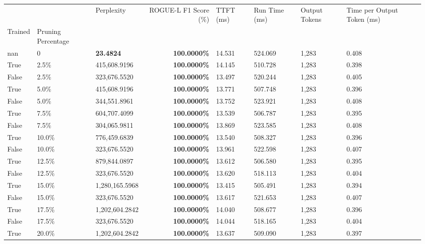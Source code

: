 \begin{table}[H]
\begin{tabular}{lllrllll}
\toprule
 &  & Perplexity & ROGUE-L F1 Score (\%) & TTFT (ms) & Run Time (ms) & Output Tokens & Time per Output Token (ms) \\
Trained & Pruning Percentage &  &  &  &  &  &  \\
\midrule
nan & 0 & \bfseries 23.4824 & \bfseries 100.0000\% & 14.531 & 524.069 & 1,283 & 0.408 \\
\cline{1-8}
True & 2.5\% & 415,608.9196 & \bfseries \color{red} 100.0000\% & 14.145 & 510.728 & 1,283 & 0.398 \\
\cline{1-8}
False & 2.5\% & 323,676.5520 & \bfseries \color{red} 100.0000\% & 13.497 & 520.244 & 1,283 & 0.405 \\
\cline{1-8}
True & 5.0\% & 415,608.9196 & \bfseries \color{red} 100.0000\% & 13.771 & 507.748 & 1,283 & 0.396 \\
\cline{1-8}
False & 5.0\% & 344,551.8961 & \bfseries \color{red} 100.0000\% & 13.752 & 523.921 & 1,283 & 0.408 \\
\cline{1-8}
True & 7.5\% & 604,707.4099 & \bfseries \color{red} 100.0000\% & 13.539 & 506.787 & 1,283 & 0.395 \\
\cline{1-8}
False & 7.5\% & \color{red} 304,065.9811 & \bfseries \color{red} 100.0000\% & 13.869 & 523.585 & 1,283 & 0.408 \\
\cline{1-8}
True & 10.0\% & 776,459.6839 & \bfseries \color{red} 100.0000\% & 13.540 & 508.327 & 1,283 & 0.396 \\
\cline{1-8}
False & 10.0\% & 323,676.5520 & \bfseries \color{red} 100.0000\% & 13.961 & 522.598 & 1,283 & 0.407 \\
\cline{1-8}
True & 12.5\% & 879,844.0897 & \bfseries \color{red} 100.0000\% & 13.612 & 506.580 & 1,283 & 0.395 \\
\cline{1-8}
False & 12.5\% & 323,676.5520 & \bfseries \color{red} 100.0000\% & 13.620 & 518.113 & 1,283 & 0.404 \\
\cline{1-8}
True & 15.0\% & 1,280,165.5968 & \bfseries \color{red} 100.0000\% & 13.415 & 505.491 & 1,283 & 0.394 \\
\cline{1-8}
False & 15.0\% & 323,676.5520 & \bfseries \color{red} 100.0000\% & 13.617 & 521.653 & 1,283 & 0.407 \\
\cline{1-8}
True & 17.5\% & 1,202,604.2842 & \bfseries \color{red} 100.0000\% & 14.040 & 508.677 & 1,283 & 0.396 \\
\cline{1-8}
False & 17.5\% & 323,676.5520 & \bfseries \color{red} 100.0000\% & 14.044 & 518.165 & 1,283 & 0.404 \\
\cline{1-8}
True & 20.0\% & 1,202,604.2842 & \bfseries \color{red} 100.0000\% & 13.637 & 509.090 & 1,283 & 0.397 \\

\end{tabular}
\end{table}
